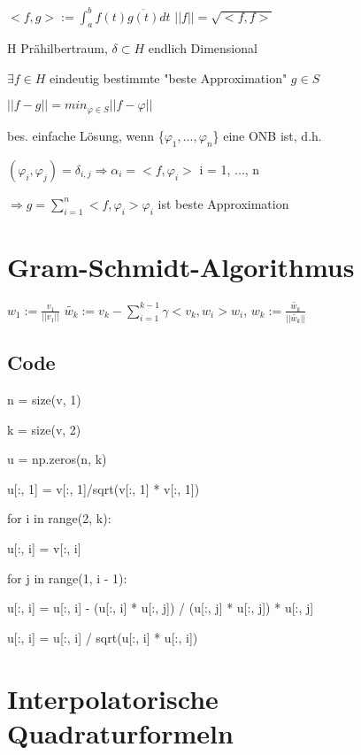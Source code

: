 \documentclass[12pt,a4paper]{article} %
\newcommand*\conj[1]{\overline{#1}}
\newcommand*\tab[1][1cm]{\hspace*{#1}}
\begin{document}
	$<f, g>:= \int_{a}^{b}f(t)\conj{g(t)}dt$ \tab $||f|| = \sqrt{<f, f>}$
	
	H Prähilbertraum, $\delta \subset H$ endlich Dimensional
	
	$\exists f \in H$ eindeutig bestimmte "beste Approximation" $g \in S$
	
	\tab $||f - g|| = min_{\varphi \in S}||f - \varphi||$
	
	bes. einfache Lösung, wenn \{$\varphi_1, ..., \varphi_n$\} eine ONB ist, d.h.
	
	$(\varphi_i, \varphi_j) = \delta_{i, j} \Rightarrow \alpha_i = <f, \varphi_i>$ \tab i = 1, ..., n
	
	\tab $\Rightarrow g = \sum_{i = 1}^{n}<f, \varphi_i>\varphi_i$ ist beste Approximation
	
	\newpage
	
	\section{Gram-Schmidt-Algorithmus}
	
	$w_1 := \frac{v_1}{||v_1||}$ \space $\tilde{w_k}:=v_k - \sum_{i = 1}^{k - 1}\gamma<v_k, w_i>w_i$, \space $w_k := \frac{\tilde{w_k}}{||\tilde{w_k}||}$
	
	\subsection{Code}
	
	n = size(v, 1)
	
	k = size(v, 2)
	
	u = np.zeros(n, k)
	
	u[:, 1] = v[:, 1]/sqrt(v[:, 1] * v[:, 1])
	
	for i in range(2, k):
	
	\tab u[:, i] = v[:, i]
	
	\tab for j in range(1, i - 1):
	
	\tab \tab u[:, i] = u[:, i] - (u[:, i] * u[:, j]) / (u[:, j] * u[:, j]) * u[:, j]
	
	\tab u[:, i] = u[:, i] / sqrt(u[:, i] * u[:, i])
	
	\newpage
	
	\section{Interpolatorische Quadraturformeln}
	
	
	
\end{document}
